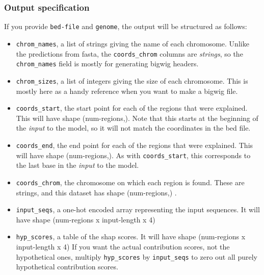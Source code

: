 \documentclass{article}
\begin{document}
\subsubsection{Output specification}

If you provide \texttt{bed-file} and \texttt{genome}, the output will be structured as follows:

\begin{itemize}
        \item \texttt{chrom\_names}, a list of strings giving the name of each chromosome.
            Unlike the predictions from fasta, the \texttt{coords\_chrom} columns are
            \emph{strings}, so the \texttt{chrom\_names} field is mostly for generating bigwig
            headers.
        \item \texttt{chrom\_sizes}, a list of integers giving the size of each chromosome.
            This is mostly here as a handy reference when you want to make a bigwig file.
        \item \texttt{coords\_start}, the start point for each of the regions that were explained.
            This will have shape (num-regions,). Note that this starts at the beginning of the
            \emph{input} to the model, so it will not match the coordinates in the bed file.
        \item \texttt{coords\_end}, the end point for each of the regions that were explained.
            This will have shape (num-regions,).
            As with \texttt{coords\_start}, this corresponds to the last base in the
            \emph{input} to the model.
        \item \texttt{coords\_chrom}, the chromosome on which each region is found.
            These are strings, and this dataset has shape (num-regions,)
            .\label{dep:interpretChroms}
        \item \texttt{input\_seqs}, a one-hot encoded array representing the input sequences.
            It will have shape (num-regions x input-length x 4)
        \item \texttt{hyp\_scores}, a table of the shap scores. It will have shape
            (num-regions x input-length x 4) If you want the actual contribution scores, not the
            hypothetical ones, multiply \texttt{hyp\_scores} by \texttt{input\_seqs} to zero out
            all purely hypothetical contribution scores.

\end{itemize}
\end{document}
